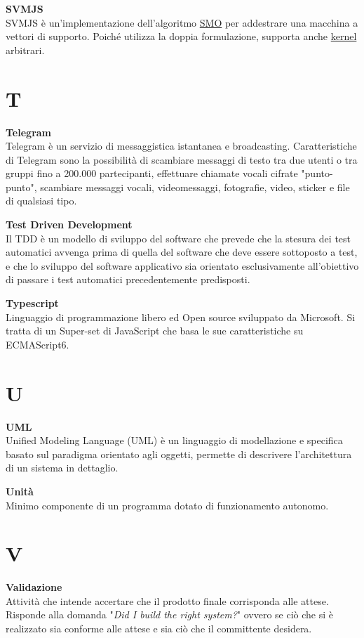 \documentclass[a4paper, oneside, openany, dvipsnames, table, 12pt]{article}
\begin{document}
\textbf{SVMJS} \\
SVMJS è un'implementazione dell'algoritmo \hyperref[par:SMO]{SMO\glo} per addestrare una macchina a vettori di supporto. Poiché utilizza la doppia formulazione, supporta anche \hyperref[par:kernel]{kernel\glo} arbitrari. 

\newpage
\section{T}
\textbf{Telegram} \\
Telegram è un servizio di messaggistica istantanea e broadcasting. Caratteristiche di Telegram sono la possibilità di scambiare messaggi di testo tra due utenti o tra gruppi fino a 200.000 partecipanti, effettuare chiamate vocali cifrate "punto-punto", scambiare messaggi vocali, videomessaggi, fotografie, video, sticker e file di qualsiasi tipo.

\label{par:tdd}
\textbf{Test Driven Development} \\
Il TDD è un modello di sviluppo del software che prevede che la stesura dei test automatici avvenga prima di quella del software che deve essere sottoposto a test, e che lo sviluppo del software applicativo sia orientato esclusivamente all'obiettivo di passare i test automatici precedentemente predisposti.

\textbf{Typescript} \\
Linguaggio di programmazione libero ed Open source sviluppato da Microsoft. Si tratta di un Super-set di JavaScript che basa le sue caratteristiche su ECMAScript6.

\newpage
\section{U}
\textbf{UML} \\
Unified Modeling Language (UML) è un linguaggio di modellazione e specifica basato sul paradigma orientato agli oggetti, permette di descrivere l’architettura di un sistema in dettaglio. 

\textbf{Unità} \\
Minimo componente di un programma dotato di funzionamento autonomo.


\newpage
\section{V}
\textbf{Validazione} \\
Attività che intende accertare che il prodotto finale corrisponda alle attese. Risponde alla domanda "\textit{Did I build the right system?}" ovvero se ciò che si è realizzato sia conforme alle attese e sia ciò che il committente desidera.
\end{document}
